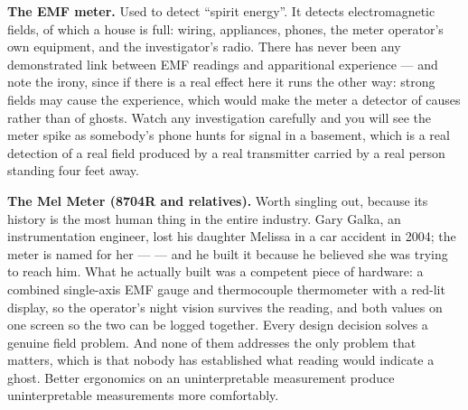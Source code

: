 \textbf{The EMF meter.} Used to detect ``spirit energy''. It detects electromagnetic fields,
of which a house is full: wiring, appliances, phones, the meter operator's own equipment, and
the investigator's radio. There has never been any demonstrated link between EMF readings and
apparitional experience --- and note the irony, since if there is a real effect here it runs
the other way: strong fields may cause the experience, which would make the meter a detector
of causes rather than of ghosts. Watch any investigation carefully and you will see the meter
spike as somebody's phone hunts for signal in a basement, which is a real detection of a real
field produced by a real transmitter carried by a real person standing four feet away.

\textbf{The Mel Meter (8704R and relatives).} Worth singling out, because its history is the most
human thing in the entire industry. Gary Galka, an instrumentation engineer, lost his
daughter Melissa in a car accident in 2004; the meter is named for her --- 
--- and he built it because he believed she was trying to reach him. What he actually built was a
competent piece of hardware: a combined single-axis EMF gauge and thermocouple thermometer with a
red-lit display, so the operator's night vision survives the reading, and both values on one
screen so the two can be logged together. Every design decision solves a genuine field problem.
And none of them addresses the only problem that matters, which is that nobody has established
what reading would indicate a ghost. Better ergonomics on an uninterpretable measurement produce
uninterpretable measurements more comfortably.

